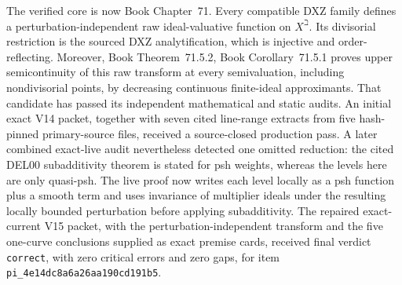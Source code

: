 \documentclass[11pt,a4paper]{article}
\theoremstyle{definition}
\theoremstyle{remark}
\begin{document}
The verified core is now Book Chapter~71.  Every compatible DXZ
family defines a perturbation-independent raw ideal-valuative function on
\(X^\beth\).  Its divisorial restriction is the sourced DXZ
analytification, which is injective and order-reflecting.  Moreover,
Book Theorem~71.5.2, Book Corollary~71.5.1
proves upper semicontinuity of this raw transform at every semivaluation,
including nondivisorial points, by decreasing continuous finite-ideal
approximants.  That candidate has passed its independent mathematical and
static audits.  An initial exact V14 packet, together with seven cited
line-range extracts from five hash-pinned primary-source files, received a
source-closed production pass.  A later combined exact-live audit nevertheless
detected one omitted reduction: the cited DEL00 subadditivity theorem is stated
for psh weights, whereas the levels here are only quasi-psh.  The live proof now
writes each level locally as a psh function plus a smooth term and uses
invariance of multiplier ideals under the resulting locally bounded
perturbation before applying subadditivity.  The repaired exact-current V15
packet, with the perturbation-independent transform and the five one-curve
conclusions supplied as exact premise cards, received final verdict
\texttt{correct}, with zero critical errors and zero gaps, for item
\nolinkurl{pi_4e14dc8a6a26aa190cd191b5}.
\end{document}
